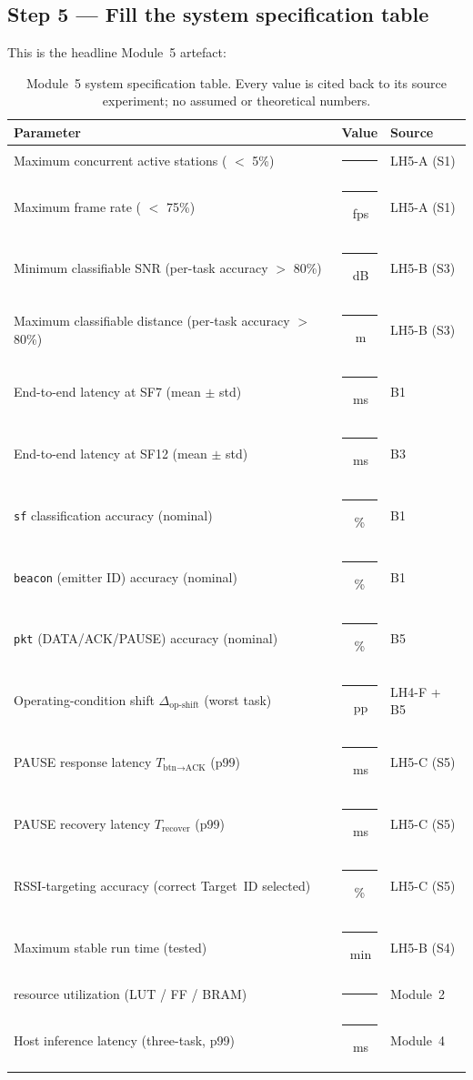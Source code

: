 \documentclass[11pt,letterpaper]{article}
\begin{document}
\subsection{Step 5 --- Fill the system specification table}
This is the headline Module~5 artefact:

\begin{table}[h!]
	\centering
	\renewcommand{\arraystretch}{1.3}
	\begin{tabularx}{\textwidth}{X c l}
		\toprule
		\textbf{Parameter} & \textbf{Value} & \textbf{Source} \\
		\midrule
		Maximum concurrent active stations (\PER{} $<$ 5\%)         & \rule{1.5cm}{0.4pt}    & LH5-A (S1) \\
		Maximum frame rate (\FIFO{} $<$ 75\%)                       & \rule{1.5cm}{0.4pt}\,fps & LH5-A (S1) \\
		Minimum classifiable \mbox{SNR} (per-task accuracy $>$ 80\%) & \rule{1.5cm}{0.4pt}\,dB & LH5-B (S3) \\
		Maximum classifiable distance (per-task accuracy $>$ 80\%)   & \rule{1.5cm}{0.4pt}\,m  & LH5-B (S3) \\
		End-to-end latency at SF7 (mean $\pm$ std)                  & \rule{1.5cm}{0.4pt}\,ms & B1 \\
		End-to-end latency at SF12 (mean $\pm$ std)                 & \rule{1.5cm}{0.4pt}\,ms & B3 \\
		\texttt{sf} classification accuracy (nominal)               & \rule{1.5cm}{0.4pt}\%   & B1 \\
		\texttt{beacon} (emitter ID) accuracy (nominal)             & \rule{1.5cm}{0.4pt}\%   & B1 \\
		\texttt{pkt} (DATA/ACK/PAUSE) accuracy (nominal)            & \rule{1.5cm}{0.4pt}\%   & B5 \\
		Operating-condition shift $\Delta_{\text{op-shift}}$ (worst task) & \rule{1.5cm}{0.4pt}\,pp & LH4-F + B5 \\
		PAUSE response latency $T_{\text{btn}\to\text{ACK}}$ (p99)  & \rule{1.5cm}{0.4pt}\,ms & LH5-C (S5) \\
		PAUSE recovery latency $T_{\text{recover}}$ (p99)           & \rule{1.5cm}{0.4pt}\,ms & LH5-C (S5) \\
		RSSI-targeting accuracy (correct Target~ID selected)        & \rule{1.5cm}{0.4pt}\%   & LH5-C (S5) \\
		Maximum stable run time (tested)                            & \rule{1.5cm}{0.4pt}\,min & LH5-B (S4) \\
		\FPGA{} resource utilization (\mbox{LUT{}} / FF / \mbox{BRAM{}}) & \rule{1.5cm}{0.4pt}  & Module~2 \\
		Host inference latency (three-task, p99)                    & \rule{1.5cm}{0.4pt}\,ms & Module~4 \\
		\bottomrule
	\end{tabularx}
	\caption{Module~5 system specification table. Every value is cited back to its source experiment; no assumed or theoretical numbers.}
\end{table}
\end{document}
